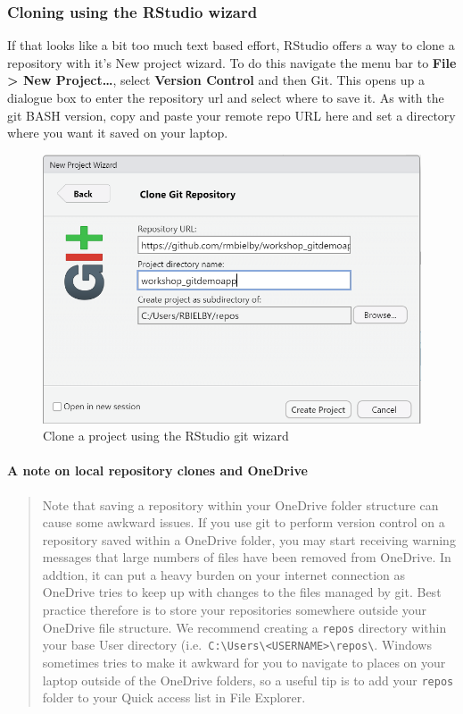 \documentclass[
  12pt,
]{article}
\begin{document}
\hypertarget{cloning-using-the-rstudio-wizard}{%
\subsubsection{Cloning using the RStudio
wizard}\label{cloning-using-the-rstudio-wizard}}

If that looks like a bit too much text based effort, RStudio offers a
way to clone a repository with it's New project wizard. To do this
navigate the menu bar to \textbf{File \textgreater{} New
Project\ldots{}}, select \textbf{Version Control} and then Git. This
opens up a dialogue box to enter the repository url and select where to
save it. As with the git BASH version, copy and paste your remote repo
URL here and set a directory where you want it saved on your laptop.

\begin{figure}
\includegraphics[width=0.6\linewidth]{images/gitdemo/gitdemo-RStudio_OpenProj_wizard} \caption{Clone a project using the RStudio git wizard}\label{fig:unnamed-chunk-7}
\end{figure}

\hypertarget{a-note-on-local-repository-clones-and-onedrive}{%
\paragraph{A note on local repository clones and
OneDrive}\label{a-note-on-local-repository-clones-and-onedrive}}

\begin{quote}
Note that saving a repository within your OneDrive folder structure can
cause some awkward issues. If you use git to perform version control on
a repository saved within a OneDrive folder, you may start receiving
warning messages that large numbers of files have been removed from
OneDrive. In addtion, it can put a heavy burden on your internet
connection as OneDrive tries to keep up with changes to the files
managed by git. Best practice therefore is to store your repositories
somewhere outside your OneDrive file structure. We recommend creating a
\texttt{repos} directory within your base User directory
(i.e.~\texttt{C:\textbackslash{}Users\textbackslash{}\textless{}USERNAME\textgreater{}\textbackslash{}repos\textbackslash{}}.
Windows sometimes tries to make it awkward for you to navigate to places
on your laptop outside of the OneDrive folders, so a useful tip is to
add your \texttt{repos} folder to your Quick access list in File
Explorer.
\end{quote}
\end{document}
